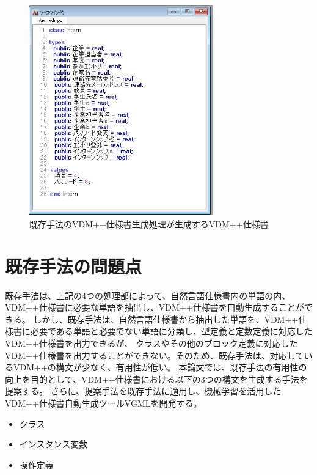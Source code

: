 \begin{figure}[tp]
    \begin{center}
        \includegraphics[width=300]{image/exis_vdm.png}
        \caption{既存手法のVDM++仕様書生成処理が生成するVDM++仕様書}
        \label{fig:exis_vdm}
    \end{center}
\end{figure}

\section{既存手法の問題点}
\label{sec:problemm}
既存手法は、上記の4つの処理部によって、自然言語仕様書内の単語の内、VDM++仕様書に必要な単語を抽出し、VDM++仕様書を自動生成することができる。
しかし、既存手法は、自然言語仕様書から抽出した単語を、VDM++仕様書に必要である単語と必要でない単語に分類し、型定義と定数定義に対応したVDM++仕様書を出力できるが、
クラスやその他のブロック定義に対応したVDM++仕様書を出力することができない。そのため、既存手法は、対応しているVDM++の構文が少なく、有用性が低い。
本論文では、既存手法の有用性の向上を目的として、VDM++仕様書における以下の3つの構文を生成する手法を提案する。
さらに、提案手法を既存手法に適用し、機械学習を活用したVDM++仕様書自動生成ツールVGMLを開発する。

\begin{itemize}
    \item クラス
    \item インスタンス変数
    \item 操作定義
\end{itemize}